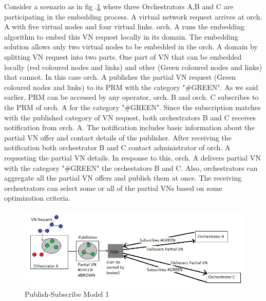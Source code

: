 \documentclass[article,dr=phil,type=msc ,colorback,accentcolor=tud4b]{tudthesis}
\begin{document}
Consider a scenario as in fig .\ref{pub_sub} where three Orchestrators A,B and C are participating in the embedding process. A virtual network request arrives at orch. A with five virtual nodes and four virtual links. orch. A runs the embedding algorithm to embed this VN request locally in its domain. The embedding solution allows only two virtual nodes to be embedded in the orch. A domain by splitting VN request into two parts. One part of VN that can be embedded locally (red coloured nodes and links) and other (Green coloured nodes  and links) that cannot. In this case orch. A publishes the partial VN request (Green coloured nodes and links) to its PRM with the category "\#GREEN". As we said earlier, PRM can be accessed by any operator, orch. B and orch. C subscribes to the PRM of orch. A for the category "\#GREEN". Since the subscription matches with the published category of VN request, both orchestrators B and C receives notification from orch. A. The notification includes basic information about the partial VN offer and contact details of the publisher. After receiving the notification both orchestrator B and C contact administrator of orch. A requesting the partial VN details. In response to this, orch. A delivers partial VN with the category "\#GREEN"  the orchestators B and C. Also, orchestrators can aggregate all the partial VN offers and publish them at once. The receiving orchestrators can select some or all of the partial VNs based on some optimization criteria.
\begin{figure}[h]
	\centering
	\includegraphics[width=\linewidth]{psm1.png}
	\caption{Publish-Subscribe Model 1}
	\label{pub_sub}
\end{figure}
\end{document}
